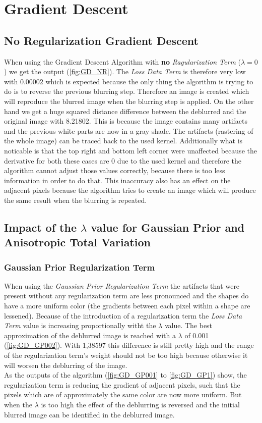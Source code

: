 \documentclass{report}
\begin{document}
	\section{Gradient Descent}
	\startsection
		\renewcommand{\thesubsection}{\thesection.\alph{subsection}}
		\subsection{No Regularization Gradient Descent}
		\startsubsection
			When using the Gradient Descent Algorithm with \textbf{no} \textit{Ragularization Term} ($\lambda = 0$) we get the output (\ref{fig:GD_NR}). The \textit{Loss Data Term} is therefore very low with $0.00002$ which is expected because the only thing the algorithm is trying to do is to reverse the previous blurring step. Therefore an image is created which will reproduce the blurred image when the blurring step is applied. On the other hand we get a huge squared distance difference between the deblurred and the original image with 8.21802. This is because the image contains many artifacts and the previous white parts are now in a gray shade. The artifacts (rastering of the whole image) can be traced back to the used kernel. Additionally what is noticable is that the top right and bottom left corner were unaffected because the derivative for both these cases are 0 due to the used kernel and therefore the algorithm cannot adjust those values correctly, because there is too less information in order to do that. This inaccuracy also has an effect on the adjacent pixels because the algorithm tries to create an image which will produce the same result when the blurring is repeated.
		\closesection
		\subsection{Impact of the $\lambda$ value for Gaussian Prior and Anisotropic Total Variation}
		\startsubsection
			\subsubsection{Gaussian Prior Regularization Term}
			\startsubsection
				When using the \textit{Gaussian Prior Regularization Term} the artifacts that were present without any regularization term are less pronounced and the shapes do have a more uniform color (the gradients between each pixel within a shape are lessened). Because of the introduction of a regularization term the \textit{Loss Data Term} value is increasing proportionally witht the $\lambda$ value. The best approximation of the deblurred image is reached with a $\lambda$ of 0.001 (\ref{fig:GD_GP002}). With 1,38597 this difference is still pretty high and the range of the regularization term's weight should not be too high because otherwise it will worsen the deblurring of the image. \\
				As the outputs of the algorithm (\ref{fig:GD_GP001} to \ref{fig:GD_GP1}) show, the regularization term is reducing the gradient of adjacent pixels, such that the pixels which are of approximately the same color are now more uniform. But when the $\lambda$ is too high the effect of the deblurring is reversed and the initial blurred image can be identified in the deblurred image.
			\closesection
\end{document}

